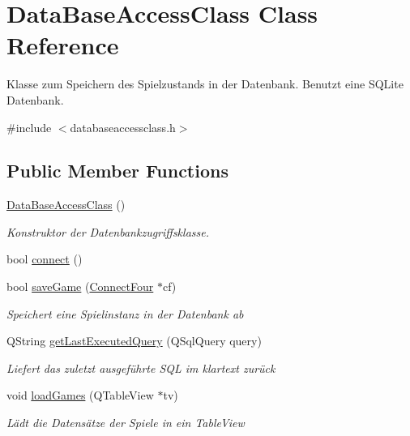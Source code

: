 \hypertarget{class_data_base_access_class}{\section{Data\-Base\-Access\-Class Class Reference}
\label{class_data_base_access_class}
}


Klasse zum Speichern des Spielzustands in der Datenbank. Benutzt eine S\-Q\-Lite Datenbank.  




{\ttfamily \#include $<$databaseaccessclass.\-h$>$}

\subsection*{Public Member Functions}
\begin{DoxyCompactItemize}
\item 
\hyperlink{class_data_base_access_class_a44e5ea09d3bb57547bf4ed458549b00e}{Data\-Base\-Access\-Class} ()
\begin{DoxyCompactList}\small\item\em Konstruktor der Datenbankzugriffsklasse. \end{DoxyCompactList}\item 
bool \hyperlink{class_data_base_access_class_ad14618bc623fa2921405281100e98fd6}{connect} ()
\item 
bool \hyperlink{class_data_base_access_class_ac6944e91e73d748d54886921e10a8148}{save\-Game} (\hyperlink{class_connect_four}{Connect\-Four} $\ast$cf)
\begin{DoxyCompactList}\small\item\em Speichert eine Spielinstanz in der Datenbank ab \end{DoxyCompactList}\item 
Q\-String \hyperlink{class_data_base_access_class_a65a96f9e828f32087bf52c1624f78724}{get\-Last\-Executed\-Query} (Q\-Sql\-Query query)
\begin{DoxyCompactList}\small\item\em Liefert das zuletzt ausgeführte S\-Q\-L im klartext zurück \end{DoxyCompactList}\item 
void \hyperlink{class_data_base_access_class_a7b1d1dc517185da0160b0686963440cb}{load\-Games} (Q\-Table\-View $\ast$tv)
\begin{DoxyCompactList}\small\item\em Lädt die Datensätze der Spiele in ein Table\-View \end{DoxyCompactList}\end{DoxyCompactItemize}


